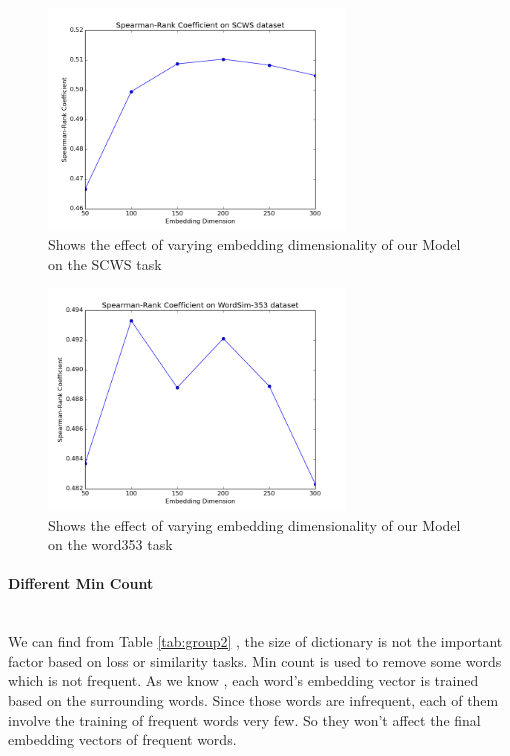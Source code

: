 \begin{figure}[!ht]
  \centering
	\includegraphics[width=0.7\textwidth]{vecSCWS} 
	\caption{Shows the effect of varying embedding dimensionality of our Model on the SCWS task}
	\label{fig:vec_SCWS}
\end{figure}


\begin{figure}[!ht]
  \centering
	\includegraphics[width=0.7\textwidth]{vecword353} 
	\caption{Shows the effect of varying embedding dimensionality of our Model on the word353 task}
	\label{fig:vec_word353}
\end{figure}




\paragraph{Different Min Count} \ \\
We can find from Table \ref{tab:group2} , the size of dictionary is not the important factor based on loss or similarity tasks. Min count is used to remove some words which is not frequent. As we know , each word's embedding vector is trained based on the surrounding words. Since those words are infrequent, each of them involve the training of frequent words very few. So they won't affect the final embedding vectors of frequent words.

